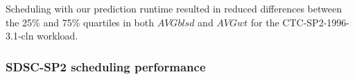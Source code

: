\documentclass[a4paper,fleqn]{cas-sc}
\begin{document}
Scheduling with our prediction runtime resulted in reduced differences between the 25\% and 75\% quartiles in both $A\!V\!Gblsd$ and $A\!V\!Gwt$ for the CTC-SP2-1996-3.1-cln workload.

\subsubsection{SDSC-SP2 scheduling performance}
\begin{figure}[htbp]
	\centering	
\end{figure}
\end{document}
